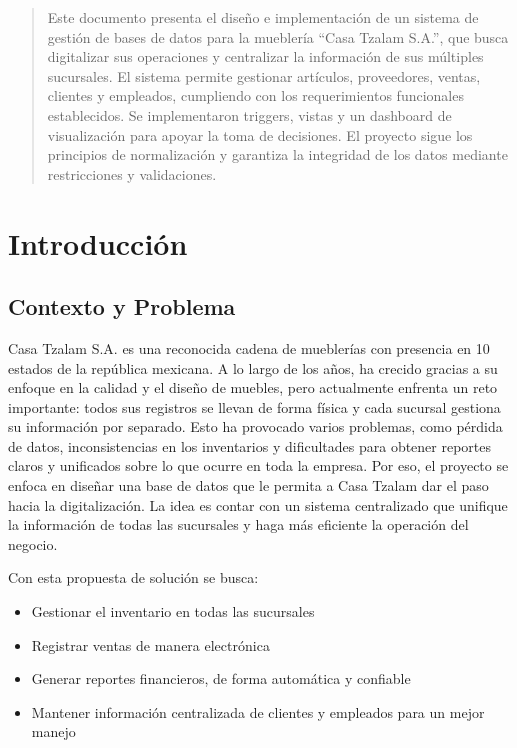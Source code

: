 \documentclass[a4paper, 12pt]{article}
\begin{document}
\maketitle

\begin{abstract}
Este documento presenta el diseño e implementación de un sistema de gestión de bases de datos para la mueblería ``Casa Tzalam S.A.'', que busca digitalizar sus operaciones y centralizar la información de sus múltiples sucursales. El sistema permite gestionar artículos, proveedores, ventas, clientes y empleados, cumpliendo con los requerimientos funcionales establecidos. Se implementaron triggers, vistas y un dashboard de visualización para apoyar la toma de decisiones. El proyecto sigue los principios de normalización y garantiza la integridad de los datos mediante restricciones y validaciones.
\end{abstract}
\clearpage 

\tableofcontents

\section{Introducción}
\subsection{Contexto y Problema}
Casa Tzalam S.A. es una reconocida cadena de mueblerías con presencia en 10 estados de la república mexicana. A lo largo de los años, ha crecido gracias a su enfoque en la calidad y el diseño de muebles, pero actualmente enfrenta un reto importante: todos sus registros se llevan de forma física y cada sucursal gestiona su información por separado.
\vspace{5mm}
Esto ha provocado varios problemas, como pérdida de datos, inconsistencias en los inventarios y dificultades para obtener reportes claros y unificados sobre lo que ocurre en toda la empresa.
\vspace{5mm}
Por eso, el proyecto se enfoca en diseñar una base de datos que le permita a Casa Tzalam dar el paso hacia la digitalización. La idea es contar con un sistema centralizado que unifique la información de todas las sucursales y haga más eficiente la operación del negocio.

Con esta propuesta de solución se busca:
\vspace{5mm}
\begin{itemize}
    \item Gestionar el inventario en todas las sucursales
    \item Registrar ventas de manera electrónica
    \item Generar reportes financieros, de forma automática y confiable
    \item Mantener información centralizada de clientes y empleados para un mejor manejo
\end{itemize}
\end{document}

